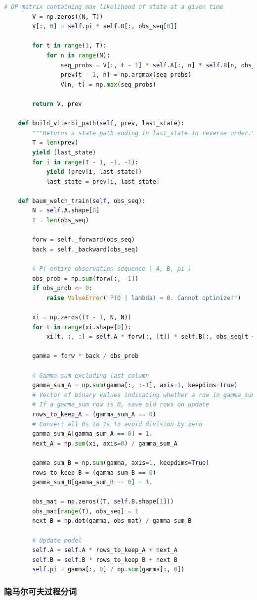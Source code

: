 \documentclass[twoside,a4paper,12pt]{book}%
\begin{document}
\begin{lstlisting}[language={python}]
		# DP matrix containing max likelihood of state at a given time
		V = np.zeros((N, T))
		V[:, 0] = self.pi * self.B[:, obs_seq[0]]

		for t in range(1, T):
			for n in range(N):
				seq_probs = V[:, t - 1] * self.A[:, n] * self.B[n, obs_seq[t]]
				prev[t - 1, n] = np.argmax(seq_probs)
				V[n, t] = np.max(seq_probs)

		return V, prev

	def build_viterbi_path(self, prev, last_state):
		"""Returns a state path ending in last_state in reverse order."""
		T = len(prev)
		yield (last_state)
		for i in range(T - 1, -1, -1):
			yield (prev[i, last_state])
			last_state = prev[i, last_state]

	def baum_welch_train(self, obs_seq):
		N = self.A.shape[0]
		T = len(obs_seq)

		forw = self._forward(obs_seq)
		back = self._backward(obs_seq)

		# P( entire observation sequence | A, B, pi )
		obs_prob = np.sum(forw[:, -1])
		if obs_prob <= 0:
			raise ValueError("P(O | lambda) = 0. Cannot optimize!")

		xi = np.zeros((T - 1, N, N))
		for t in range(xi.shape[0]):
			xi[t, :, :] = self.A * forw[:, [t]] * self.B[:, obs_seq[t + 1]] * back[:, t + 1] / obs_prob

		gamma = forw * back / obs_prob

		# Gamma sum excluding last column
		gamma_sum_A = np.sum(gamma[:, :-1], axis=1, keepdims=True)
		# Vector of binary values indicating whether a row in gamma_sum is 0.
		# If a gamma_sum row is 0, save old rows on update
		rows_to_keep_A = (gamma_sum_A == 0)
		# Convert all 0s to 1s to avoid division by zero
		gamma_sum_A[gamma_sum_A == 0] = 1.
		next_A = np.sum(xi, axis=0) / gamma_sum_A

		gamma_sum_B = np.sum(gamma, axis=1, keepdims=True)
		rows_to_keep_B = (gamma_sum_B == 0)
		gamma_sum_B[gamma_sum_B == 0] = 1.

		obs_mat = np.zeros((T, self.B.shape[1]))
		obs_mat[range(T), obs_seq] = 1
		next_B = np.dot(gamma, obs_mat) / gamma_sum_B

		# Update model
		self.A = self.A * rows_to_keep_A + next_A
		self.B = self.B * rows_to_keep_B + next_B
		self.pi = gamma[:, 0] / np.sum(gamma[:, 0])
\end{lstlisting}

\subsubsection{隐马尔可夫过程分词}
\end{document}
